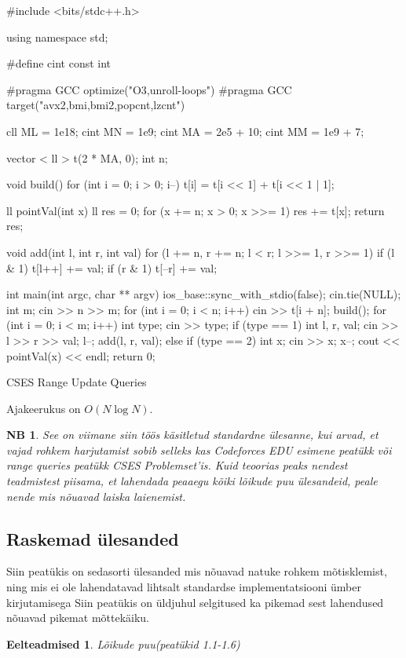 \documentclass{trkut}
\newtheorem*{prereq}{Eelteadmised}
\newtheorem*{extra}{NB}
\begin{document}
\begin{cclol}
#include <bits/stdc++.h>

using namespace std;

#define cint
const int

#pragma GCC optimize("O3,unroll-loops")
#pragma GCC target("avx2,bmi,bmi2,popcnt,lzcnt")

cll ML = 1e18;
cint MN = 1e9;
cint MA = 2e5 + 10;
cint MM = 1e9 + 7;

vector < ll > t(2 * MA, 0);
int n;

void build() {
  for (int i = 0; i > 0; i--) t[i] = t[i << 1] + t[i << 1 | 1];
}

ll pointVal(int x) {
  ll res = 0;
  for (x += n; x > 0; x >>= 1) res += t[x];
  return res;
}

void add(int l, int r, int val) {
  for (l += n, r += n; l < r; l >>= 1, r >>= 1) {
    if (l & 1) t[l++] += val;
    if (r & 1) t[--r] += val;
  }
}

int main(int argc, char ** argv) {
  ios_base::sync_with_stdio(false);
  cin.tie(NULL);
  int m;
  cin >> n >> m;
  for (int i = 0; i < n; i++) {
    cin >> t[i + n];
  }
  build();
  for (int i = 0; i < m; i++) {
    int type;
    cin >> type;
    if (type == 1) {
      int l, r, val;
      cin >> l >> r >> val;
      l--;
      add(l, r, val);
    } else if (type == 2) {
      int x;
      cin >> x;
      x--;
      cout << pointVal(x) << endl;
    }
  }
  return 0;
}
    \end{cclol}
    \begin{kk}[H]
    \caption{CSES Range Update Queries}%
    \end{kk}

Ajakeerukus on $O(N\log N)$.


\begin{extra}
See on viimane siin töös käsitletud standardne ülesanne, kui arvad, et vajad rohkem harjutamist sobib selleks kas Codeforces EDU esimene peatükk või range queries peatükk CSES Problemset'is. 
Kuid teoorias peaks nendest teadmistest piisama, et lahendada peaaegu kõiki lõikude puu ülesandeid, peale nende mis nõuavad laiska laienemist.
\end{extra}


    
\subsection{Raskemad ülesanded}
Siin peatükis on sedasorti ülesanded mis nõuavad natuke rohkem mõtisklemist, ning mis ei ole lahendatavad lihtsalt standardse implementatsiooni ümber kirjutamisega
Siin peatükis on üldjuhul selgitused ka pikemad sest lahendused nõuavad pikemat mõttekäiku.
\begin{prereq}
Lõikude puu(peatükid 1.1-1.6)
\end{prereq}
\end{document}
